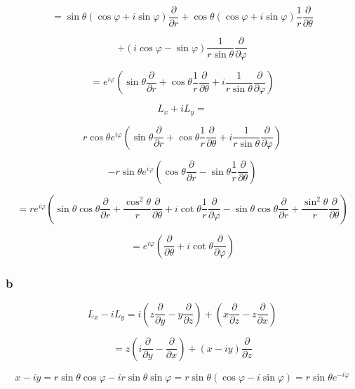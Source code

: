 \documentclass[12pt]{article}
\begin{document}
\[
    = \sin{\theta} \left(\cos{\varphi} + i \sin{\varphi}\right) \frac{\partial}{\partial r}
    + \cos{\theta} \left(\cos{\varphi} + i \sin{\varphi}\right) \frac{1}{r} \frac{\partial}{\partial \theta}
\]

\[
    + \left(i \cos{\varphi} - \sin{\varphi}\right)  \frac{1}{r \sin{\theta}} \frac{\partial}{\partial \varphi}
\]

\[
    = e^{i \varphi}
    \left(
    \sin{\theta} \frac{\partial}{\partial r}+ \cos{\theta} \frac{1}{r} \frac{\partial}{\partial \theta}
    + i \frac{1}{r \sin{\theta}} \frac{\partial}{\partial \varphi}
    \right)
\]

\[
    L_x + i L_y =
\]

\[
    r \cos{\theta} e^{i \varphi}
    \left(
    \sin{\theta} \frac{\partial}{\partial r}
    + \cos{\theta} \frac{1}{r} \frac{\partial}{\partial \theta}
    + i \frac{1}{r \sin{\theta}} \frac{\partial}{\partial \varphi}
    \right)
\]

\[
    - r \sin{\theta} e^{i \varphi}
    \left(
    \cos{\theta} \frac{\partial}{\partial r} - \sin{\theta} \frac{1}{r} \frac{\partial}{\partial \theta}
    \right)
\]

\[
    = r e^{i \varphi}
    \left(
    \sin{\theta} \cos{\theta} \frac{\partial}{\partial r}
    + \frac{\cos^2{\theta}}{r} \frac{\partial}{\partial \theta}
    + i \cot{\theta} \frac{1}{r}\frac{\partial}{\partial \varphi}
    - \sin{\theta} \cos{\theta} \frac{\partial}{\partial r}
    + \frac{\sin^2{\theta}}{r} \frac{\partial}{\partial \theta}
    \right)
\]

\[
    = e^{i \varphi}
    \left(
    \frac{\partial}{\partial \theta}
    + i \cot{\theta}\frac{\partial}{\partial \varphi}
    \right)
\]

\subsubsection{b}

\[
    L_x - i L_y = i \left(z \frac{\partial}{\partial y} - y \frac{\partial}{\partial z}\right)
    + \left(x \frac{\partial}{\partial z} - z \frac{\partial}{\partial x}\right)
\]

\[
    = z \left(i \frac{\partial}{\partial y} - \frac{\partial}{\partial x}\right) + \left( x - i y\right)
    \frac{\partial}{\partial z}
\]

\[
    x - i y = r \sin{\theta} \cos{\varphi} - i r \sin{\theta} \sin{\varphi} = r \sin{\theta}
    \left(\cos{\varphi} - i \sin{\varphi}\right) = r \sin{\theta} e^{-i \varphi}
\]
\end{document}
